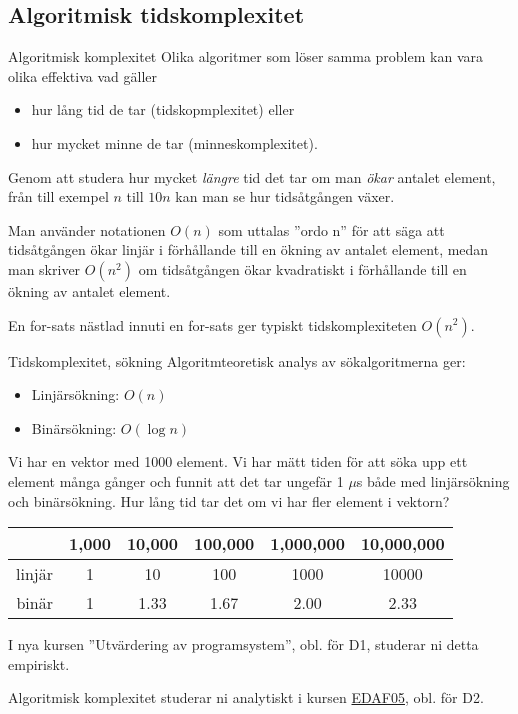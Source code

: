 \documentclass{lecturenotes}
\begin{document}
\subsection{Algoritmisk tidskomplexitet}
\begin{Slide}{Algoritmisk komplexitet}\footnotesize
Olika algoritmer som löser samma problem kan vara olika effektiva vad gäller 
\begin{itemize}
\item hur lång tid de tar (tidskopmplexitet) eller 
\item hur mycket minne de tar (minneskomplexitet). 
\end{itemize}
\vspace{1em}
Genom att studera hur mycket \emph{längre} tid det tar om man \emph{ökar} antalet element, från till exempel $n$ till $10n$ kan man se hur tidsåtgången växer. 

\vspace{1em}
Man använder notationen $O(n)$ som uttalas ''ordo n'' för att säga att tidsåtgången ökar linjär i förhållande till en ökning av antalet element, medan man skriver $O(n^2)$ om tidsåtgången ökar kvadratiskt i förhållande till en ökning av antalet element.

\vspace{1em} En for-sats nästlad innuti en for-sats ger typiskt tidskomplexiteten $O(n^2)$.
\end{Slide} 



\begin{Slide}{Tidskomplexitet, sökning}
Algoritmteoretisk analys av sökalgoritmerna ger:
\begin{itemize}
\item Linjärsökning: $O(n)$ 
\item Binärsökning:  $O(\log n)$
\end{itemize}
\vspace{1em}
Vi har en vektor med 1000 element. Vi har mätt tiden för att söka upp ett element många gånger och funnit att det tar ungefär 1 $\mu$s både med linjärsökning och binärsökning. Hur lång tid tar det om vi har fler element i vektorn?\\
\vspace{1em}
\begin{tabular}{rccccc}
       & 1,000 & 10,000 & 100,000 & 1,000,000 & 10,000,000 \\ \hline
linjär & 1     & 10     & 100     & 1000     & 10000 \\
binär  & 1     & 1.33   & 1.67    & 2.00     & 2.33
\end{tabular}
\vspace{1em} 

\scriptsize 

I nya kursen ''Utvärdering av programsystem'', obl. för D1, studerar ni detta empiriskt.

Algoritmisk komplexitet studerar ni analytiskt i kursen \href{http://cs.lth.se/edaf05}{EDAF05}, obl. för D2.
\end{Slide} 
\end{document}
